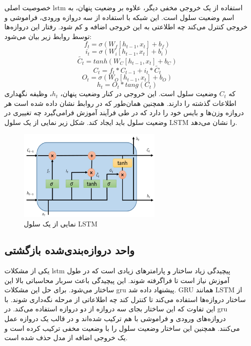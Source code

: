 خصوصیت اصلی \gls{lstm} استفاده از یک خروجی مخفی دیگر، علاوه بر وضعیت پنهان، به
اسم وضعیت سلول است. این شبکه با استفاده از سه دروازه ورودی، فراموشی و خروجی
کنترل می‌کند چه اطلاعتی به این خروجی اضافه و کم شود. رفتار این دروازه‌ها توسط
روابط زیر بیان می‌شود:
\begin{equation}
    f_t = \sigma(W_f [h_{t-1},x_t] + b_f)
\end{equation}
\begin{equation}
    i_t = \sigma(W_i [h_{t-1},x_t] + b_i)
\end{equation}
\begin{equation}
    \tilde{C_t} = tanh(W_C [h_{t-1}, x_t] + b_C)
\end{equation}
\begin{equation}
    C_t = f_t * C_{t-1} + i_t * \tilde{C_t}
\end{equation}
\begin{equation}
    O_t = \sigma(W_O [h_{t-1},x_t] + b_O)
\end{equation}
\begin{equation}
    h_t = O_t * tang(C_t)
\end{equation}
که $C_t$ وضعیت سلول است. این خروجی در کنار وضعیت پنهان، $h_t$، وظیفه نگهداری
اطلاعات گذشته را دارند. همچنین همان‌طور که در روابط نشان داده شده است هر دروازه
وزن‌ها و بایس خود را دارد که در طی فرآیند آموزش فرامی‌گیرد چه تغییری در وضعیت
سلول باید ایجاد کند. شکل زیر نمایی از یک سلول \gls{LSTM} را نشان می‌دهد.
\begin{figure}[ht]
    \centering
    \includegraphics[height=4.5cm]{./statics/lstm_cell.png}
    \caption{نمایی از یک سلول \gls{LSTM}}
\end{figure}

\subsection{واحد دروازه‌بندی‌شده بازگشتی}
یکی از مشکلات \gls{lstm} پیچیدگی زیاد ساختار و پارامترهای زیادی است که در طول
آموزش نیاز است تا فراگرفته شوند. این پیچیدگی باعث سربار محاسباتی بالا این ساختار
می‌شود. برای حل این مشکلات \gls{gru} پیشنهاد داده شد. \gls{GRU} همانند
\gls{LSTM} از ساختار دروازه‌ها استفاده می‌کند تا کنترل کند چه اطلاعاتی از مرحله
نگه‌داری شوند. با این تفاوت که این ساختار بجای سه دروازه از دو دروازه استفاده
می‌کند. در \gls{gru} دروازه‌های ورودی و فراموشی با هم ترکیب شده‌اند و در قالب یک
دروازه عمل می‌کنند. همچنین این ساختار وضعیت سلول را با وضعیت مخفی ترکیب کرده است
و یک خروجی اضافه از مدل حذف شده است.

